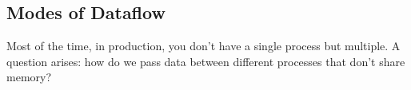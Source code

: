 




















\subsection{Modes of Dataflow}
Most of the time, in production, you don't have a single process
but multiple. A question arises: how do we pass data between
different processes that don't share memory?

